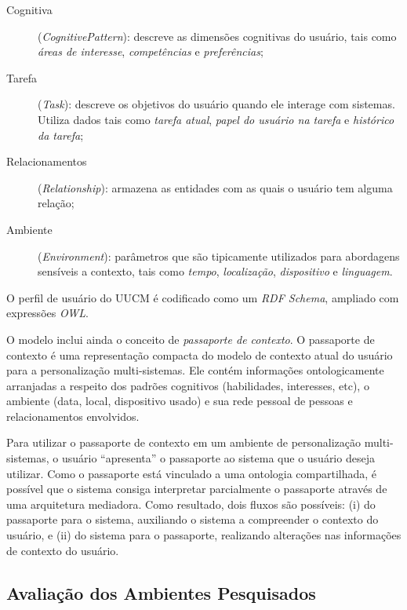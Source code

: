 \begin{description}
  \item[Cognitiva] (\emph{CognitivePattern}): descreve as dimensões cognitivas do usuário, tais como \emph{áreas de interesse}, \emph{competências} e \emph{preferências};
  \item[Tarefa] (\emph{Task}): descreve os objetivos do usuário quando ele interage com sistemas. Utiliza dados tais como \emph{tarefa atual}, \emph{papel do usuário na tarefa} e \emph{histórico da tarefa};
  \item[Relacionamentos] (\emph{Relationship}): armazena as entidades com as quais o usuário tem alguma relação;
  \item[Ambiente] (\emph{Environment}): parâmetros que são tipicamente utilizados para abordagens sensíveis a contexto, tais como \emph{tempo}, \emph{localização}, \emph{dispositivo} e \emph{linguagem}.
\end{description}

O perfil de usuário do UUCM é codificado como um \emph{RDF Schema}\cite{rdf}, ampliado com expressões \emph{OWL}.

O modelo inclui ainda o conceito de \emph{passaporte de contexto}. O passaporte de contexto é uma representação compacta do modelo de contexto atual do usuário para a personalização multi-sistemas. Ele contém informações ontologicamente arranjadas a respeito dos padrões cognitivos (habilidades, interesses, etc), o ambiente (data, local, dispositivo usado) e sua rede pessoal de pessoas e relacionamentos envolvidos.

Para utilizar o passaporte de contexto em um ambiente de personalização multi-sistemas, o usuário ``apresenta'' o passaporte ao sistema que o usuário deseja utilizar. Como o passaporte está vinculado a uma ontologia compartilhada, é possível que o sistema consiga interpretar parcialmente o passaporte através de uma arquitetura mediadora. Como resultado, dois fluxos são possíveis: (i) do passaporte para o sistema, auxiliando o sistema a compreender o contexto do usuário, e (ii) do sistema para o passaporte, realizando alterações nas informações de contexto do usuário.


\subsection{Avaliação dos Ambientes Pesquisados}

